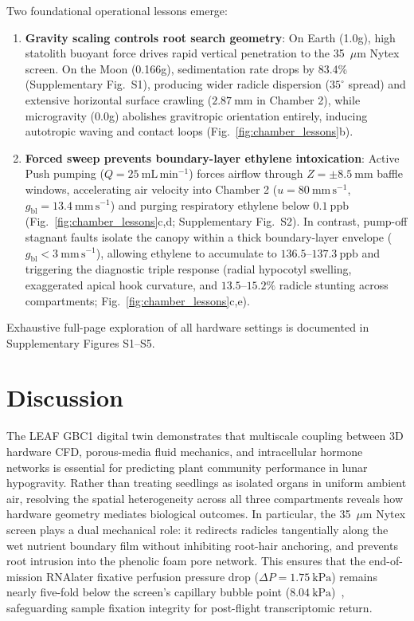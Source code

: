 \documentclass[10pt,twocolumn,twoside]{article}
\begin{document}
Two foundational operational lessons emerge:
\begin{enumerate}
    \item \textbf{Gravity scaling controls root search geometry}: On Earth (1.0g), high statolith buoyant force drives rapid vertical penetration to the 35~$\mu$m Nytex screen. On the Moon (0.166g), sedimentation rate drops by 83.4\% (Supplementary Fig.~S1), producing wider radicle dispersion ($35^\circ$ spread) and extensive horizontal surface crawling ($2.87\ \mathrm{mm}$ in Chamber 2), while microgravity (0.0g) abolishes gravitropic orientation entirely, inducing autotropic waving and contact loops (Fig.~\ref{fig:chamber_lessons}b).
    \item \textbf{Forced sweep prevents boundary-layer ethylene intoxication}: Active Push pumping ($Q = 25\ \mathrm{mL\,min^{-1}}$) forces airflow through $Z = \pm 8.5\ \mathrm{mm}$ baffle windows, accelerating air velocity into Chamber 2 ($u = 80\ \mathrm{mm\,s^{-1}}$, $g_{\mathrm{bl}} = 13.4\ \mathrm{mm\,s^{-1}}$) and purging respiratory ethylene below $0.1\ \mathrm{ppb}$ (Fig.~\ref{fig:chamber_lessons}c,d; Supplementary Fig.~S2). In contrast, pump-off stagnant faults isolate the canopy within a thick boundary-layer envelope ($g_{\mathrm{bl}} < 3\ \mathrm{mm\,s^{-1}}$), allowing ethylene to accumulate to $136.5\text{--}137.3\ \mathrm{ppb}$ and triggering the diagnostic triple response (radial hypocotyl swelling, exaggerated apical hook curvature, and $13.5\text{--}15.2\%$ radicle stunting across compartments; Fig.~\ref{fig:chamber_lessons}c,e).
\end{enumerate}
Exhaustive full-page exploration of all hardware settings is documented in Supplementary Figures S1--S5.

\section*{Discussion}

The LEAF GBC1 digital twin demonstrates that multiscale coupling between 3D hardware CFD, porous-media fluid mechanics, and intracellular hormone networks is essential for predicting plant community performance in lunar hypogravity. Rather than treating seedlings as isolated organs in uniform ambient air, resolving the spatial heterogeneity across all three compartments reveals how hardware geometry mediates biological outcomes. In particular, the 35~$\mu$m Nytex screen plays a dual mechanical role: it redirects radicles tangentially along the wet nutrient boundary film without inhibiting root-hair anchoring, and prevents root intrusion into the phenolic foam pore network. This ensures that the end-of-mission RNAlater fixative perfusion pressure drop ($\Delta P = 1.75\ \mathrm{kPa}$) remains nearly five-fold below the screen's capillary bubble point ($8.04\ \mathrm{kPa}$)~\cite{haveman2022utilizing}, safeguarding sample fixation integrity for post-flight transcriptomic return.
\end{document}
